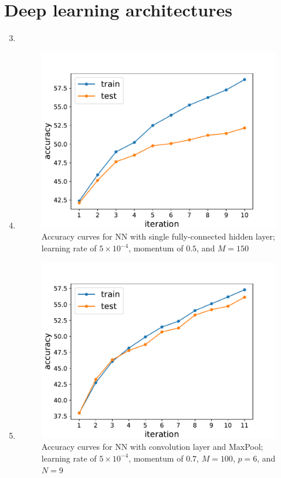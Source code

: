 \documentclass[11pt,letterpaper]{article}
\theoremstyle{definition}
\theoremstyle{plain}
\numberwithin{equation}{section}
\numberwithin{figure}{section}
\begin{document}
\section{Deep learning architectures}
\begin{enumerate}
	\setcounter{enumi}{2}
	\item

	\item
	\begin{figure}[H]
		\centering
		\includegraphics[width=.6\textwidth]{figures/3b_acc.pdf}
		\caption{Accuracy curves for NN with single fully-connected hidden layer; learning rate of $5\times10^{-4}$, momentum of $0.5$, and $M=150$}
	\end{figure}

	\item
	\begin{figure}[H]
		\centering
		\includegraphics[width=.6\textwidth]{figures/3c_acc.pdf}
		\caption{Accuracy curves for NN with convolution layer and MaxPool; learning rate of $5\times10^{-4}$, momentum of $0.7$, $M=100$, $p=6$, and $N=9$}
	\end{figure}
\end{enumerate}



\clearpage

\clearpage

\clearpage

\clearpage

\clearpage

\clearpage

\end{document}
